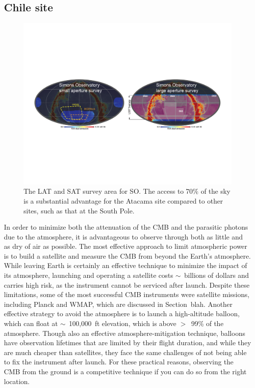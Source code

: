 
\subsection{Chile site}
\label{sec:sky_intensity}

\begin{figure}[!t]
    \centering
    \includegraphics[width=\linewidth, trim=1cm 7cm 1cm 7cm, clip]{InstrumentOverview/Figures/so_survey.pdf}
    \caption{The LAT and SAT survey area for SO. The access to 70\% of the sky is a substantial advantage for the Atacama site compared to other sites, such as that at the South Pole.}
    \label{fig:so_survey}
\end{figure}

In order to minimize both the attenuation of the CMB and the parasitic photons due to the atmosphere, it is advantageous to observe through both as little and as dry of air as possible. The most effective approach to limit atmospheric power is to build a satellite and measure the CMB from beyond the Earth's atmosphere. While leaving Earth is certainly an effective technique to minimize the impact of its atmosphere, launching and operating a satellite costs $\sim$~billions of dollars and carries high risk, as the instrument cannot be serviced after launch. Despite these limitations, some of the most successful CMB instruments were satellite missions, including Planck and WMAP, which are discussed in Section~blah. Another effective strategy to avoid the atmosphere is to launch a high-altitude balloon, which can float at $\sim$~100,000~ft elevation, which is above $>$~99\% of the atmosphere. Though also an effective atmosphere-mitigation technique, balloons have observation lifetimes that are limited by their flight duration, and while they are much cheaper than satellites, they face the same challenges of not being able to fix the instrument after launch. For these practical reasons, observing the CMB from the ground is a competitive technique if you can do so from the right location.

